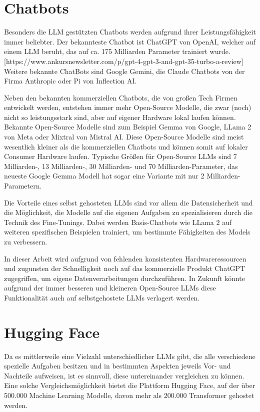 \section{Chatbots}

Besonders die LLM gestützten Chatbots werden aufgrund ihrer Leistungsfähigkeit immer beliebter.
Der bekannteste Chatbot ist ChatGPT von OpenAI, welcher auf einem LLM beruht, das auf ca. 175 Milliarden Parameter trainiert wurde. [https://www.ankursnewsletter.com/p/gpt-4-gpt-3-and-gpt-35-turbo-a-review]
Weitere bekannte ChatBots sind Google Gemini, die Claude Chatbots von der Firma Anthropic oder Pi von Inflection AI.

Neben den bekannten kommerziellen Chatbots, die von großen Tech Firmen entwickelt werden, entstehen immer mehr Open-Source Modelle, die zwar (noch) nicht so leistungsstark sind, aber auf eigener Hardware lokal laufen können.
Bekannte Open-Source Modelle sind zum Beispiel Gemma von Google, LLama 2 von Meta oder Mixtral von Mistral AI.
Diese Open-Source Modelle sind meist wesentlich kleiner als die kommerziellen Chatbots und können somit auf lokaler Consumer Hardware laufen.
Typische Größen für Open-Source LLMs sind 7 Milliarden-, 13 Milliarden-, 30 Milliarden- und 70 Milliarden-Parameter, das neueste Google Gemma Modell hat sogar eine Variante mit nur 2 Milliarden-Parametern.


Die Vorteile eines selbst gehosteten LLMs sind vor allem die Datensicherheit und die Möglichkeit, die Modelle auf die eigenen Aufgaben zu spezialisieren durch die Technik des Fine-Tunings.
Dabei werden Basis-Chatbots wie LLama 2 auf weiteren spezifischen Beispielen trainiert, um bestimmte Fähigkeiten des Models zu verbessern.

In dieser Arbeit wird aufgrund von fehlenden konsistenten Hardwareressourcen und zugunsten der Schnelligkeit noch auf das kommerzielle Produkt ChatGPT zugegriffen, um eigene Datenverarbeitungen durchzuführen.
In Zukunft könnte aufgrund der immer besseren und kleineren Open-Source LLMs diese Funktionalität auch auf selbstgehostete LLMs verlagert werden.

\section{Hugging Face}

Da es mittlerweile eine Vielzahl unterschiedlicher LLMs gibt, die alle verschiedene spezielle Aufgaben besitzen und in bestimmten Aspekten jeweils Vor- und Nachteile aufweisen, ist es sinnvoll, diese untereinander vergleichen zu können.
Eine solche Vergleichsmöglichkeit bietet die Plattform Hugging Face, auf der über 500.000 Machine Learning Modelle, davon mehr als 200.000 Transformer gehostet werden.

